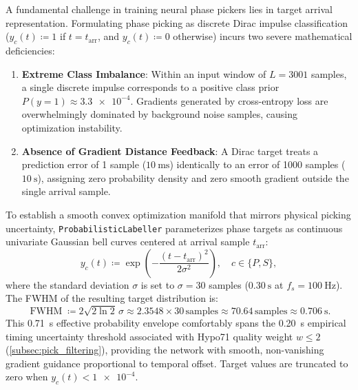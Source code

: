 A fundamental challenge in training neural phase pickers lies in target arrival
representation. Formulating phase picking as discrete Dirac impulse
classification
($y_c(t) \coloneqq 1$ if $t = t_{\mathrm{arr}}$, and $y_c(t)
\coloneqq 0$ otherwise)
incurs two severe
mathematical deficiencies:
\begin{enumerate}
  \item \textbf{Extreme Class Imbalance}: Within an input window of
    $L = \num{3001}$
    samples, a single discrete impulse corresponds to a positive class prior
    $P(y = 1) \approx \num{3.3e-4}$. Gradients generated by
    cross-entropy loss
    are overwhelmingly dominated by background noise samples,
    causing optimization
    instability.
  \item \textbf{Absence of Gradient Distance Feedback}: A Dirac target treats a
    prediction error of \num{1} sample ($\qty{10}{\milli\second}$)
    identically to an
    error of \num{1000} samples ($\qty{10}{\second}$), assigning
    zero probability
    density and zero smooth gradient outside the single arrival sample.
\end{enumerate}

To establish a smooth convex optimization manifold that mirrors
physical picking
uncertainty, \texttt{ProbabilisticLabeller} parameterizes phase
targets as continuous
univariate Gaussian bell curves centered at arrival sample $t_{\mathrm{arr}}$:
\begin{equation}
  y_c(t) \coloneqq \exp\left( -\frac{(t - t_{\mathrm{arr}})^2}{2\sigma^2}
  \right), \quad c \in \{P, S\},
  \label{eq:gaussian_target_bell}
\end{equation}
where the standard deviation $\sigma$ is set to $\sigma = \num{30}$ samples
($\qty{0.30}{\second}$ at $f_s = \qty{100}{\hertz}$). The \ac{FWHM} of the
resulting target distribution is:
\begin{equation}
  \operatorname{FWHM} \coloneqq 2\sqrt{2\ln 2}\,\sigma \approx
  \num{2.3548} \times
  \num{30}\,\text{samples} \approx \num{70.64}\,\text{samples} \approx
  \qty{0.706}{\second}.
  \label{eq:fwhm_calculation}
\end{equation}
This \qty{0.71}{\second} effective probability envelope
comfortably spans the
\qty{0.20}{\second} empirical timing uncertainty threshold associated with
Hypo71 quality weight $w \le \num{2}$
(\cref{subsec:pick_filtering}), providing
the network with smooth, non-vanishing gradient guidance
proportional to temporal
offset. Target values are truncated to zero when $y_c(t) < \num{1e-4}$.

